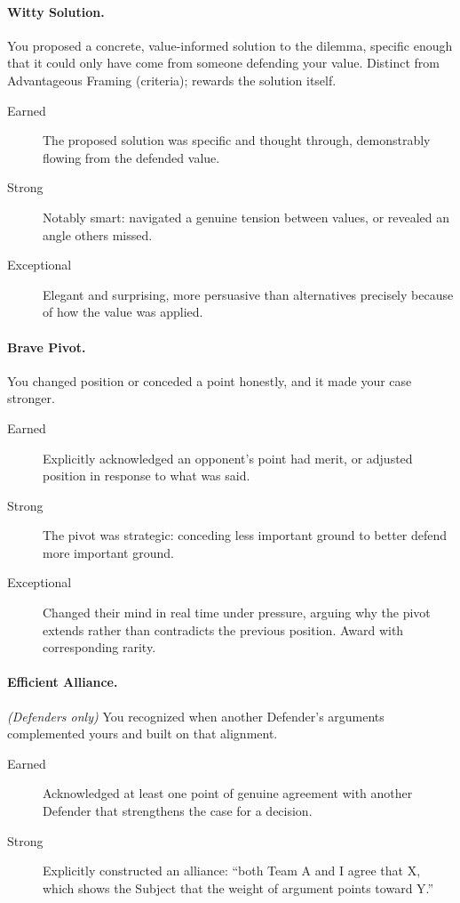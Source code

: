 \documentclass[12pt]{article}
\begin{document}
\paragraph{Witty Solution.} You proposed a concrete, value-informed solution to the dilemma, specific enough that it could only have come from someone defending your value. Distinct from Advantageous Framing (criteria); rewards the solution itself.
\begin{description}
    \item[Earned] The proposed solution was specific and thought through, demonstrably flowing from the defended value.
    \item[Strong] Notably smart: navigated a genuine tension between values, or revealed an angle others missed.
    \item[Exceptional] Elegant and surprising, more persuasive than alternatives precisely because of how the value was applied.
\end{description}

\paragraph{Brave Pivot.} You changed position or conceded a point honestly, and it made your case stronger.
\begin{description}
    \item[Earned] Explicitly acknowledged an opponent's point had merit, or adjusted position in response to what was said.
    \item[Strong] The pivot was strategic: conceding less important ground to better defend more important ground.
    \item[Exceptional] Changed their mind in real time under pressure, arguing why the pivot extends rather than contradicts the previous position. Award with corresponding rarity.
\end{description}

\paragraph{Efficient Alliance.} \textit{(Defenders only)} You recognized when another Defender's arguments complemented yours and built on that alignment.
\begin{description}
    \item[Earned] Acknowledged at least one point of genuine agreement with another Defender that strengthens the case for a decision.
    \item[Strong] Explicitly constructed an alliance: ``both Team A and I agree that X, which shows the Subject that the weight of argument points toward Y.''
\end{description}
\end{document}
